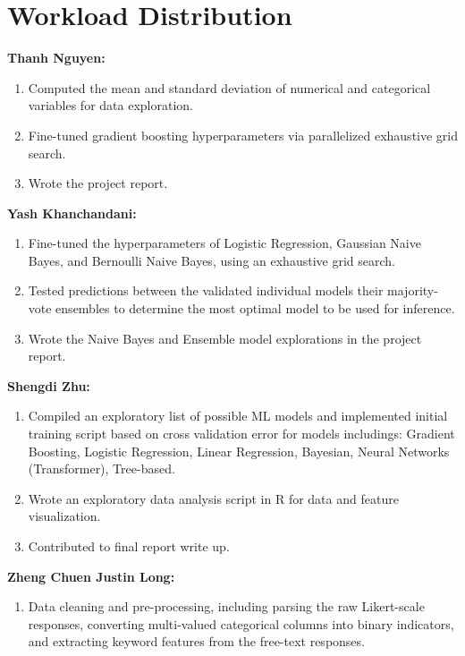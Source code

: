 \documentclass[12pt]{article}
\begin{document}
\section{Workload Distribution}

\textbf{Thanh Nguyen:}
\begin{enumerate}
\item Computed the mean and standard deviation of numerical and categorical variables for data exploration.
\item Fine-tuned gradient boosting hyperparameters via parallelized exhaustive grid search.
\item Wrote the project report.
\end{enumerate}

\textbf{Yash Khanchandani:}
\begin{enumerate}
\item Fine-tuned the hyperparameters of Logistic Regression, Gaussian Naive Bayes, and Bernoulli Naive Bayes, using an exhaustive grid search.
\item Tested predictions between the validated individual models their majority-vote ensembles to determine the most optimal model to be used for inference.
\item Wrote the Naive Bayes and Ensemble model explorations in the project report.
\end{enumerate}

\textbf{Shengdi Zhu:}
\begin{enumerate}
\item Compiled an exploratory list of possible ML models and implemented initial training script based on cross validation error for models includings: Gradient Boosting, Logistic Regression, Linear Regression, Bayesian, Neural Networks (Transformer), Tree-based.
\item Wrote an exploratory data analysis script in R for data and feature visualization.
\item Contributed to final report write up.
\end{enumerate}

\textbf{Zheng Chuen Justin Long:}
\begin{enumerate}
\item Data cleaning and pre-processing, including parsing the raw Likert-scale responses, converting multi-valued categorical columns into binary indicators, and extracting keyword features from the free-text responses.
\end{enumerate}
\end{document}
